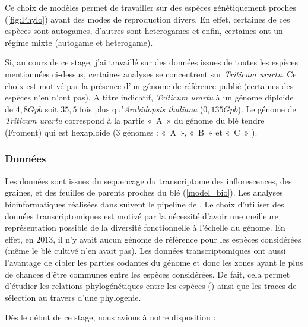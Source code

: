 \documentclass[../main]{subfiles} %
\begin{document}
Ce choix de modèles permet de travailler sur des espèces génétiquement proches (\cref{fig:Phylo}) ayant des modes de reproduction divers. En effet, certaines de ces espèces sont \glspl{autogame}, d’autres sont \glspl{heterogame} et enfin, certaines ont un régime mixte (\gls{autogame} et \gls{heterogame}).

Si, au cours de ce stage, j’ai travaillé sur des données issues de toutes les espèces mentionnées ci-dessus,  certaines  analyses se concentrent sur \textit{Triticum urartu}. Ce choix est motivé par la présence d'un génome de référence publié (certaines des espèces n'en n'ont pas). A titre indicatif, \textit{Triticum urartu} à un génome \gls{diploide} de $4,8 Gpb$ soit $35,5$ fois plus qu'\textit{Arabidopsis thaliana} ($0,135 Gpb$). Le génome de \textit{Triticum urartu} correspond à la partie « A » du génome du blé tendre (Froment) qui est \gls{hexaploide} (3 génomes : « A », « B » et « C »  \cite{noauthor_ble_2024}).


\subsubsection{Données}
\label{sec:donnees}



Les  données sont issues du \gls{sequencage} du \gls{transcriptome}
des \glspl{inflorescence}, des graines, et des feuilles de parents proches du blé (\cref{model_bio}). Les analyses bioinformatiques réalisées dans  \cite{burgarella_mating_2024} suivent le pipeline de \cite{sarah_large_2017}. 
Le choix d’utiliser des données \glspl{transcriptomique} est motivé par la nécessité d'avoir une meilleure représentation possible de la diversité fonctionnelle à l'échelle du génome. En effet, en 2013, il n'y avait aucun génome de référence pour les espèces considérées (même le blé cultivé n'en avait pas). Les données \glspl{transcriptomique} ont aussi l'avantage de cibler les parties codantes du génome et donc les zones ayant le plus de chances d’être communes entre les espèces considérées. De fait, cela permet d’étudier les relations phylogénétiques entre les espèces (\cite{glemin_pervasive_2019}) ainsi que les traces de sélection au travers d'une \gls{phylogenie}. 


Dès le début de ce stage, nous avions à notre disposition :
\end{document}
